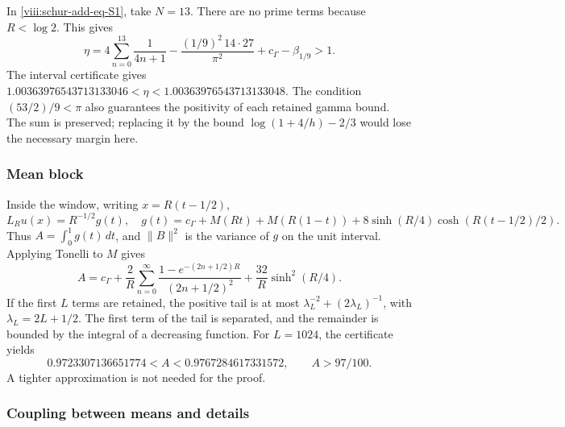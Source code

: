 In \eqref{viii:schur-add-eq-S1}, take \(N=13\). There are no prime terms because
\(R<\log2\). This gives
\begin{equation}
\eta=4\sum_{n=0}^{13}\frac1{4n+1}
-\frac{(1/9)^2\,14\cdot27}{\pi^2}+c_\Gamma-\beta_{1/9}>1.
\label{viii:schur-add-eq-S9}
\end{equation}
The interval certificate gives
\(1.00363976543713133046<\eta<1.00363976543713133048\).
The condition \((53/2)/9<\pi\) also guarantees the positivity of
each retained gamma bound. The sum is preserved; replacing it by the
bound \(\log(1+4/h)-2/3\) would lose the necessary margin here.

\subsubsection{Mean block}
\label{viii:schur-add-sub-269}

Inside the window, writing \(x=R(t-1/2)\),
\begin{equation}
L_Ru(x)=R^{-1/2}g(t),\quad
g(t)=c_\Gamma+M(Rt)+M(R(1-t))
+8\sinh(R/4)\cosh(R(t-1/2)/2).
\label{viii:schur-add-display-22}
\end{equation}
Thus \(A=\int_0^1g(t)\,dt\), and \(\|B\|^2\) is the variance
of \(g\) on the unit interval. Applying Tonelli to \(M\) gives
\begin{equation}
A=c_\Gamma+\frac2R\sum_{n=0}^\infty
\frac{1-e^{-(2n+1/2)R}}{(2n+1/2)^2}
+\frac{32}R\sinh^2(R/4).
\label{viii:schur-add-eq-S10}
\end{equation}
If the first \(L\) terms are retained, the positive tail is at
most \(\lambda_L^{-2}+(2\lambda_L)^{-1}\), with
\(\lambda_L=2L+1/2\). The first term of the tail is separated, and the
remainder is bounded by the integral of a decreasing function. For
\(L=1024\), the certificate yields
\begin{equation}
0.9723307136651774<A<0.9767284617331572,
\qquad A>97/100.
\label{viii:schur-add-eq-S11}
\end{equation}
A tighter approximation is not needed for the proof.

\subsubsection{Coupling between means and details}
\label{viii:schur-add-sub-295}

